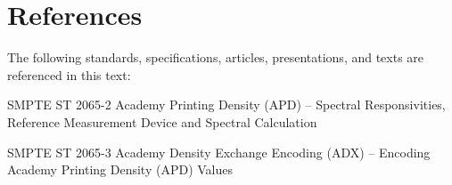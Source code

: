 \numberedformat
\chapter{References}
The following standards, specifications, articles, presentations, and texts are referenced in this text:

SMPTE ST 2065-2 Academy Printing Density (APD) -- Spectral Responsivities, Reference Measurement Device and Spectral Calculation

SMPTE ST 2065-3 Academy Density Exchange Encoding (ADX) -- Encoding Academy Printing Density (APD) Values
